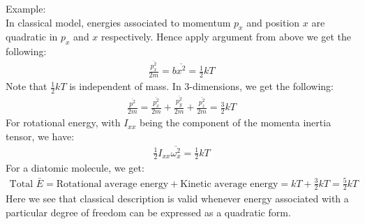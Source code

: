 \documentclass[11pt,oneside]{book}
\theoremstyle{break}
\theoremstyle{break}
\newcommand{\example}{\color{green}Example: \color{black}}
\begin{document}
\example\\
In classical model, energies associated to momentum $p_x$ and position $x$ are quadratic in $p_x$ and $x$ respectively. Hence apply argument from above we get the following:
\begin{align*}
\frac{\overline{p_x^2}}{2m} =b\overline{x^2} =\frac{1}{2}kT
\end{align*}
Note that $\frac{1}{2}kT$ is independent of mass. In $3$-dimensions, we get the following:
\begin{align*}
\frac{\overline{p^2}}{2m} = \frac{\overline{p_x^2}}{2m}+\frac{\overline{p_y^2}}{2m}+\frac{\overline{p_z^2}}{2m} = \frac{3}{2}kT
\end{align*}
For rotational energy, with $I_{xx}$ being the component of the momenta inertia tensor, we have:
\begin{align*}
\frac{1}{2}I_{xx}\overline{\omega_x^2} = \frac{1}{2}kT
\end{align*}
For a diatomic molecule, we get:
\begin{align*}
\text{Total }\bar{E} = \text{Rotational average energy} + \text{Kinetic average energy} = kT + \frac{3}{2}kT = \frac{5}{2}kT
\end{align*}
Here we see that classical description is valid whenever energy associated with a particular degree of freedom can be expressed as a quadratic form.\\
\end{document}
